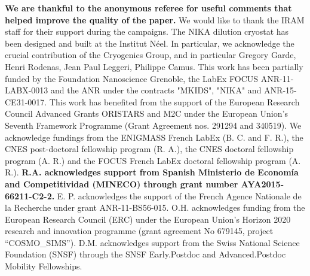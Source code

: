 \documentclass[twocolumn,traditabstract]{aa}
\begin{document}
\begin{acknowledgements}
{\bf We are thankful to the anonymous referee for useful comments that helped improve the quality of the paper.}
We would like to thank the IRAM staff for their support during the campaigns. 
The NIKA dilution cryostat has been designed and built at the Institut N\'eel. In particular, we acknowledge the crucial contribution of the Cryogenics Group, and  in particular Gregory Garde, Henri Rodenas, Jean Paul Leggeri, Philippe Camus. 
This work has been partially funded by the Foundation Nanoscience Grenoble, the LabEx FOCUS ANR-11-LABX-0013 and the ANR under the contracts "MKIDS", "NIKA" and ANR-15-CE31-0017. 
This work has benefited from the support of the European Research Council Advanced Grants ORISTARS and M2C under the European Union's Seventh Framework Programme (Grant Agreement nos. 291294 and 340519).
We acknowledge fundings from the ENIGMASS French LabEx (B. C. and F. R.), the CNES post-doctoral fellowship program (R. A.),  the CNES doctoral fellowship program (A. R.) and the FOCUS French LabEx doctoral fellowship program (A. R.).
{\bf R.A. acknowledges support from Spanish Ministerio de Econom\'ia and Competitividad (MINECO) through grant number AYA2015-66211-C2-2.}
E. P. acknowledges the support of the French Agence Nationale de la Recherche under grant ANR-11-BS56-015.
O.H. acknowledges funding from the European Research Council (ERC) under the European Union's Horizon 2020 research and innovation programme (grant agreement No 679145, project “COSMO\_SIMS”).
D.M. acknowledges support from the Swiss National Science Foundation (SNSF) through the SNSF Early.Postdoc and Advanced.Postdoc Mobility Fellowships. 
\end{acknowledgements}



\appendix
\end{document}

